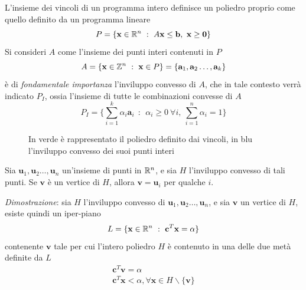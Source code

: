 \documentclass[10pt, letterpaper]{report}
\newcommand{\bb}{{\mathbf{b}}}
\newcommand{\bc}{{\mathbf{c}}}
\newcommand{\x}{{\mathbf{x}}}
\begin{document}
L'insieme dei vincoli di un programma intero definisce un poliedro proprio come quello definito da un programma lineare 
$$ P=\{\x\in\R^n \ : \ A\x\le\bb, \ \x\ge \mathbf 0\}$$
Si consideri $A$ come l'insieme dei punti interi contenuti in $P$
$$ A=\{\x\in\Z^n \ : \ \x\in P\}=\{\mathbf a_1,\mathbf a_2\dots,\mathbf a_k\}$$
è di \textit{fondamentale importanza} l'inviluppo convesso di $A$, che in tale contesto verrà indicato $P_I$, ossia l'insieme di tutte le combinazioni convesse di $A$
$$P_I =
     \Big\{\sum_{i=1}^k \alpha_i\mathbf{a}_i  \ \ : \ \ \alpha_i\ge 0 \ \forall i,\ \sum_{i=1}^n \alpha_i=1\Big\} $$

\begin{figure}[h]
    \caption{In verde è rappresentato il poliedro definito dai vincoli, in blu l'inviluppo convesso dei suoi punti interi}
\end{figure}
\begin{proposizione}
    Sia $\mathbf u_1,\mathbf u_2\dots,\mathbf u_n$ un'insieme di punti in ${\mathbb R}^n$, e sia $H$ l'inviluppo convesso di tali punti. Se $\mathbf v$ è un vertice di $H$, allora $\mathbf v = \mathbf u_i$ per qualche $i$.
\end{proposizione}
\textit{Dimostrazione}: sia $H$ l'inviluppo convesso di $\mathbf u_1,\mathbf u_2\dots,\mathbf u_n$, e sia $\mathbf v$ un vertice di $H$, esiste quindi un iper-piano 
$$L=\{\x\in\R^n \ : \ \bc^T\x=\alpha\} $$contenente $\mathbf v$ tale per cui l'intero poliedro $H$ è contenuto in una delle due metà definite da $L$\begin{eqnarray*}
    \bc^T\mathbf v = \alpha\\ 
    \bc^T\x<\alpha, \forall \x\in H\backslash\{\mathbf v\}
\end{eqnarray*}

\begin{figure}[h]
\end{figure}
\end{document}
